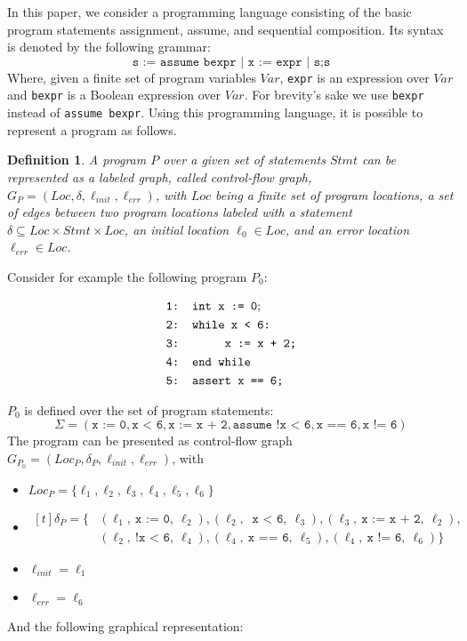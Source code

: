 \documentclass{article}
\newtheorem{mydef}{Definition}
\begin{document}
In this paper, we consider a programming language consisting of the basic program statements assignment, assume, and sequential composition. Its syntax is denoted by the following grammar:
\begin{equation*}
	\texttt{s := assume bexpr | x := expr | s;s}
\end{equation*}
Where, given a finite set of program variables $Var$, \texttt{expr} is an expression over $Var$ and \texttt{bexpr} is a Boolean expression over $Var$. For brevity's sake we use \texttt{bexpr} instead of \texttt{assume bexpr}.
Using this programming language, it is possible to represent a program as follows.
\begin{mydef}
	A program $P$ over a given set of statements $Stmt$ can be represented as a labeled graph, called control-flow graph, $G_P = (Loc, \delta, \ell_{init}, \ell_{err})$, with $Loc$ being a finite set of program locations, a set of edges between two program locations labeled with a statement $\delta \subseteq Loc \times Stmt \times Loc$, an initial location $\ell_0 \in Loc$, and an error location $\ell_{err} \in Loc$.
\end{mydef}

Consider for example the following program $P_0$:
\begin{figure}[H]
	\begin{align*}
		&\texttt{1: int x := 0}; \\
		&\texttt{2: while x < 6:} \\
		&\texttt{3: \hspace*{2em} x := x + 2;} \\
		&\texttt{4: end while} \\
		&\texttt{5: assert x == 6;}
	\end{align*}
	\label{fig:square}
\end{figure}

$P_0$ is defined over the set of program statements: 
\begin{equation*}
	\Sigma = (\texttt{x := 0},\texttt{x < 6}, \texttt{x := x + 2}, \texttt{assume !x < 6}, \texttt{x == 6}, \texttt{x != 6})
\end{equation*} 
The program can be presented as control-flow graph $G_{P_0} = (Loc_P, \delta_P, \ell_{init}, \ell_{err})$, with 
\begin{itemize}
	\item $Loc_P = \{ \ell_1, \ell_2, \ell_3, \ell_4, \ell_5, \ell_6 \}$
	\item $\begin{aligned}[t]	\delta_P = \{ &(\ell_1,\ \texttt{x := 0},\ \ell_2), (\ell_2,\ \texttt{ x < 6},\ \ell_3), (\ell_3,\ \texttt{x := x + 2},\ \ell_2), \\ &(\ell_2,\ \texttt{!x < 6},\ \ell_4), (\ell_4,\ \texttt{x == 6},\ \ell_5), (\ell_4,\ \texttt{x != 6},\ \ell_6)\} \end{aligned}$
	\item  $\ell_{init} = \ell_1$
	\item $\ell_{err} = \ell_6$
\end{itemize}
And the following graphical representation: 
\end{document}
